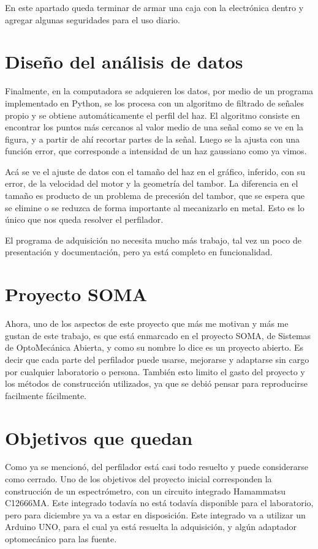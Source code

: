 \documentclass{article}
\begin{document}
En este apartado queda terminar de armar una caja con la electrónica dentro y agregar algunas seguridades para el uso diario.

\section{Diseño del análisis de datos}
Finalmente, en la computadora se adquieren los datos, por medio de un programa implementado en Python, se los procesa con un algoritmo de filtrado de señales propio y se obtiene automáticamente el perfil del haz. El algoritmo consiste en encontrar los puntos más cercanos al valor medio de una señal como se ve en la figura, y a partir de ahí recortar partes de la señal. Luego se la ajusta con una función error, que corresponde a intensidad de un haz gaussiano como ya vimos. 

Acá se ve el ajuste de datos con el tamaño del haz en el gráfico, inferido, con su error, de la velocidad del motor y la geometría del tambor. La diferencia en el tamaño es producto de un problema de precesión del tambor, que se espera que se elimine o se reduzca de forma importante al mecanizarlo en metal. Esto es lo único que nos queda resolver el perfilador.

El programa de adquisición no necesita mucho más trabajo, tal vez un poco de presentación y documentación, pero ya está completo en funcionalidad.


\section{Proyecto SOMA}

Ahora, uno de los aspectos de este proyecto que más me motivan y más me gustan de este trabajo, es que está enmarcado en el proyecto SOMA, de Sistemas de OptoMecánica Abierta, y como su nombre lo dice es un proyecto abierto. Es decir que cada parte del perfilador puede usarse, mejorarse y adaptarse sin cargo por cualquier laboratorio o persona. También esto limito el gasto del proyecto y los métodos de construcción utilizados, ya que se debió pensar para reproducirse facilmente fácilmente.

\section{Objetivos que quedan}

Como ya se mencionó, del perfilador está casi todo resuelto y puede considerarse como cerrado. Uno de los objetivos del proyecto inicial corresponden la construcción de un espectrómetro, con un circuito integrado Hamammatsu C12666MA. Este integrado todavía no está todavía disponible para el laboratorio, pero para diciembre ya va a estar en disposición. Este integrado va a utilizar un Arduino UNO, para el cual ya está resuelta la adquisición, y algún adaptador optomecánico para las fuente.
\end{document}
